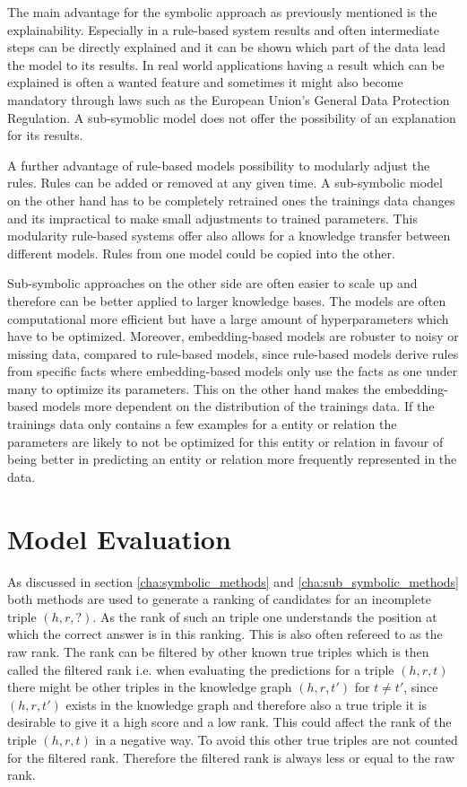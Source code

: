 The main advantage for the symbolic approach as previously mentioned is the explainability. Especially in a rule-based system results and often intermediate steps can be directly explained and it can be shown which part of the data lead the model to its results. In real world applications having a result which can be explained is often a wanted feature and sometimes it might also become mandatory through laws such as the European Union’s General Data Protection Regulation. A sub-symoblic model does not offer the possibility of an explanation for its results. 

A further advantage of rule-based models possibility to modularly adjust the rules. Rules can be added or removed at any given time. A sub-symbolic model on the other hand has to be completely retrained ones the trainings data changes and its impractical to make small adjustments to trained parameters. This modularity rule-based systems offer also allows for a knowledge transfer between different models. Rules from one model could be copied into the other. 

Sub-symbolic approaches on the other side are often easier to scale up and therefore can be better applied to larger knowledge bases. The models are often computational more efficient but have a large amount of hyperparameters which have to be optimized. Moreover, embedding-based models are robuster to noisy or missing data, compared to rule-based models, since rule-based models derive rules from specific facts where embedding-based models only use the facts as one under many to optimize its parameters. This on the other hand makes the embedding-based models more dependent on the distribution of the trainings data. If the trainings data only contains a few examples for a entity or relation the parameters are likely to not be optimized for this entity or relation in favour of being better in predicting an entity or relation more frequently represented in the data. \cite{ilkou_symbolic_2020}


\section{Model Evaluation}
\label{cha:evaluation}
As discussed in section \ref{cha:symbolic_methods} and \ref{cha:sub_symbolic_methods} both methods are used to generate a ranking of candidates for an incomplete triple $(h,r,?)$. As the rank of such an triple one understands the position at which the correct answer is in this ranking. This is also often refereed to as the raw rank. The rank can be filtered by other known true triples which is then called the filtered rank i.e. when evaluating the predictions for a triple $(h,r,t)$ there might be other triples in the knowledge graph $(h,r,t')$ for $t \neq t'$, since $(h,r,t')$ exists in the knowledge graph and therefore also a true triple it is desirable to give it a high score and a low rank. This could affect the rank of the triple $(h,r,t)$ in a negative way. To avoid this other true triples are not counted for the filtered rank. Therefore the filtered rank is always less or equal to the raw rank. \cite{bordes_translating_2013}

